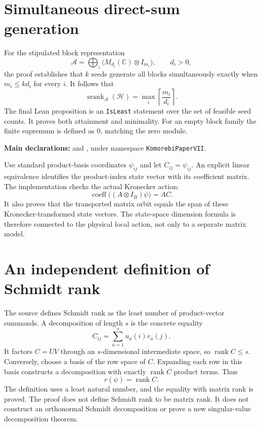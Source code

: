 \documentclass[10pt,letterpaper]{article}
\newcommand{\C}{\mathbb C}\newcommand{\R}{\mathbb R}\newcommand{\N}{\mathbb N}
\newcommand{\rank}{\operatorname{rank}}\newcommand{\spanof}{\operatorname{span}}
\newcommand{\srank}{\operatorname{srank}}
\newcommand{\code}[1]{\texttt{\small #1}}
\newcommand{\pageheading}[2]{\vspace*{2pt}{\small\color{ink}\textsc{#1}}\par\vspace{2pt}{\Large\bfseries #2}\par\vspace{4pt}}
\begin{document}
\section*{Simultaneous direct-sum generation}
For the stipulated block representation
\[
\mathcal A=\bigoplus_i\bigl(M_{d_i}(\C)\otimes I_{m_i}\bigr),\qquad d_i>0,
\]
the proof establishes that $k$ seeds generate all blocks simultaneously exactly when $m_i\le kd_i$ for every $i$. It follows that
\[
\boxed{\srank_{\mathcal A}(\mathcal H)=\max_i\left\lceil\frac{m_i}{d_i}\right\rceil.}
\]
The final Lean proposition is an \code{IsLeast} statement over the set of feasible seed counts. It proves both attainment and minimality. For an empty block family the finite supremum is defined as $0$, matching the zero module.

\textbf{Main declarations:}  and , under namespace \code{KomorebiPaperVII}.

\newpage
\pageheading{Corollary 2.3}{Schmidt rank and the reduced state}
Use standard product-basis coordinates $\psi_{ij}$ and let $C_{ij}=\psi_{ij}$. An explicit linear equivalence identifies the product-index state vector with its coefficient matrix. The implementation checks the actual Kronecker action:
\[
\operatorname{coeff}\bigl((A\otimes I_B)\psi\bigr)=AC.
\]
It also proves that the transported matrix orbit equals the span of these Kronecker-transformed state vectors. The state-space dimension formula is therefore connected to the physical local action, not only to a separate matrix model.

\section*{An independent definition of Schmidt rank}
The source defines Schmidt rank as the least number of product-vector summands. A decomposition of length $s$ is the concrete equality
\[
C_{ij}=\sum_{a=1}^{s}u_a(i)v_a(j).
\]
It factors $C=UV$ through an $s$-dimensional intermediate space, so $\rank C\le s$. Conversely, choose a basis of the row space of $C$. Expanding each row in this basis constructs a decomposition with exactly $\rank C$ product terms. Thus
\[
\boxed{r(\psi)=\rank C.}
\]
The definition uses a least natural number, and the equality with matrix rank is proved. The proof does not define Schmidt rank to be matrix rank. It does not construct an orthonormal Schmidt decomposition or prove a new singular-value decomposition theorem.
\end{document}
